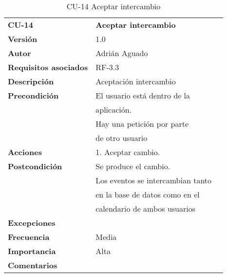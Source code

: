 \begin{table}[H]
\begin{tabular}{llr}  
\toprule
\begin{minipage}[b]{0.24\columnwidth}\raggedright\strut
\textbf{CU-14}\strut
\end{minipage} & \begin{minipage}[b]{0.72\columnwidth}\raggedright\strut
\textbf{Aceptar intercambio}\strut
\end{minipage}\tabularnewline
\cmidrule(r){1-2}
\textbf{Versión}       & 1.0           \\
\textbf{Autor}       & Adrián  Aguado    \\
\textbf{Requisitos asociados}       & RF-3.3 \\
\textbf{Descripción} & Aceptación intercambio \\
\textbf{Precondición}  & El usuario está dentro de la \\
& aplicación.      \\
& Hay una petición por parte \\
& de otro usuario \\
\textbf{Acciones} & 1. Aceptar cambio. \\
\textbf{Postcondición} & Se produce el cambio. \\
& Los eventos se intercambian tanto \\
& en la base de datos como en el \\
& calendario de ambos usuarios \\
\textbf{Excepciones} &     \\
\textbf{Frecuencia} & Media          \\
\textbf{Importancia} & Alta            \\
\textbf{Comentarios } &   \\
\bottomrule
\end{tabular}
\caption{CU-14 Aceptar intercambio} 
\end{table}

